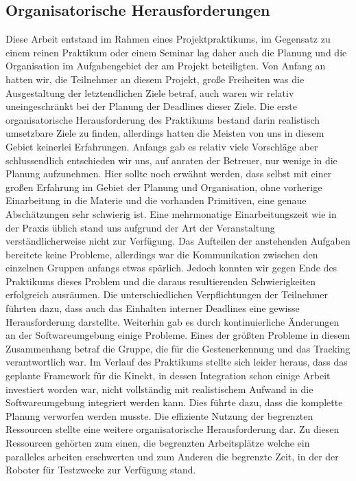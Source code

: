 \subsection{Organisatorische Herausforderungen}
Diese Arbeit entstand im Rahmen eines Projektpraktikums, im Gegensatz
 zu einem reinen Praktikum oder einem Seminar lag daher auch
 die Planung und die Organisation im Aufgabengebiet der am Projekt
 beteiligten. Von Anfang an hatten wir, die Teilnehmer an diesem
 Projekt, große Freiheiten was die Ausgestaltung der letztendlichen
 Ziele betraf, auch waren wir relativ uneingeschränkt bei der Planung
 der Deadlines dieser Ziele. Die erste organisatorische
 Herausforderung des Praktikums bestand darin realistisch umsetzbare
 Ziele zu finden, allerdings hatten die Meisten von uns in diesem
 Gebiet keinerlei Erfahrungen. Anfangs gab es relativ viele Vorschläge
 aber schlussendlich entschieden wir uns, auf anraten der Betreuer,
 nur wenige in die Planung aufzunehmen. Hier sollte noch erwähnt
 werden, dass selbst mit einer großen Erfahrung im Gebiet der
 Planung und Organisation, ohne vorherige Einarbeitung in die Materie
 und die vorhanden Primitiven, eine genaue Abschätzungen sehr
 schwierig ist. Eine mehrmonatige Einarbeitungszeit wie in der Praxis
 üblich stand uns aufgrund der Art der Veranstaltung
 verständlicherweise nicht zur Verfügung.
 Das Aufteilen der anstehenden Aufgaben bereitete keine Probleme,
 allerdings war die Kommunikation zwischen den einzelnen Gruppen
 anfangs etwas spärlich. Jedoch konnten wir gegen Ende des
 Praktikums dieses Problem und die daraus resultierenden
 Schwierigkeiten erfolgreich ausräumen. Die unterschiedlichen
 Verpflichtungen der Teilnehmer führten dazu, dass auch das
 Einhalten interner Deadlines eine gewisse Herausforderung
 darstellte. Weiterhin gab es durch kontinuierliche Änderungen
 an der Softwareumgebung einige Probleme. Eines der größten Probleme
 in diesem Zusammenhang betraf die Gruppe, die für die
 Gestenerkennung und das Tracking verantwortlich war.
 Im Verlauf des Praktikums stellte sich leider heraus,
 dass das geplante Framework für die Kinekt, in dessen Integration
 schon einige Arbeit investiert worden war, nicht vollständig
 mit realistischem Aufwand in die Softwareumgebung integriert werden
 kann. Dies führte dazu, dass die komplette Planung verworfen
 werden musste. Die effiziente Nutzung der begrenzten Ressourcen
 stellte eine weitere organisatorische Herausforderung dar.
 Zu diesen Ressourcen gehörten zum einen, die begrenzten Arbeitsplätze
 welche ein paralleles arbeiten erschwerten und zum Anderen die
 begrenzte Zeit, in der der Roboter für Testzwecke zur Verfügung
 stand.
